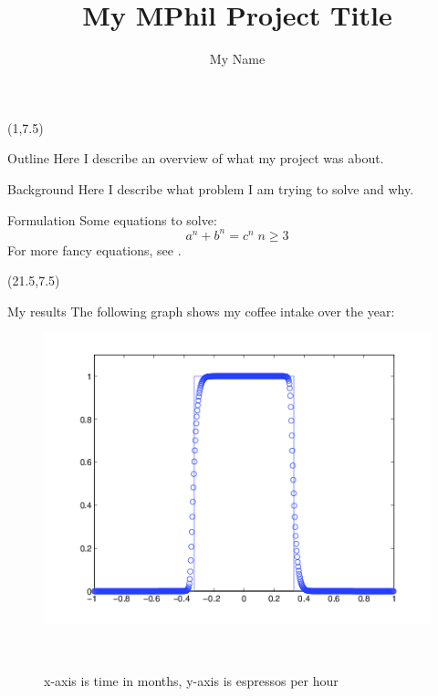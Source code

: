\documentclass[final]{beamer}
\title{My MPhil Project Title}
\author{My Name}
\begin{document}
\begin{frame}{} 

\begin{textblock}{19.5}(1,7.5)
\begin{block}{Outline}
Here I describe an overview of what my project was about.
\end{block}

\begin{block}{Background}
Here I describe what problem I am trying to solve and why.
\end{block}

\begin{block}{Formulation}
Some equations to solve:
\begin{equation*}
a^n + b^n = c^n\;n \geqslant 3
\end{equation*}
For more fancy equations, see \cite{TeXBook}.
\end{block}


\end{textblock}


\begin{textblock}{19.5}(21.5,7.5)
\begin{block}{My results}
The following graph shows my coffee intake over the year:\\
\begin{figure}
\begin{minipage}{0.95\linewidth}
\includegraphics[width = \linewidth]{ENOTest3b.png}
\end{minipage}\\
\begin{minipage}{0.95\linewidth}
\caption{x-axis is time in months, y-axis is espressos per hour}
\label{fig:CoffeeFig}
\end{minipage}
\end{figure}
\end{block}


\end{textblock}
\end{frame}
\end{document}

